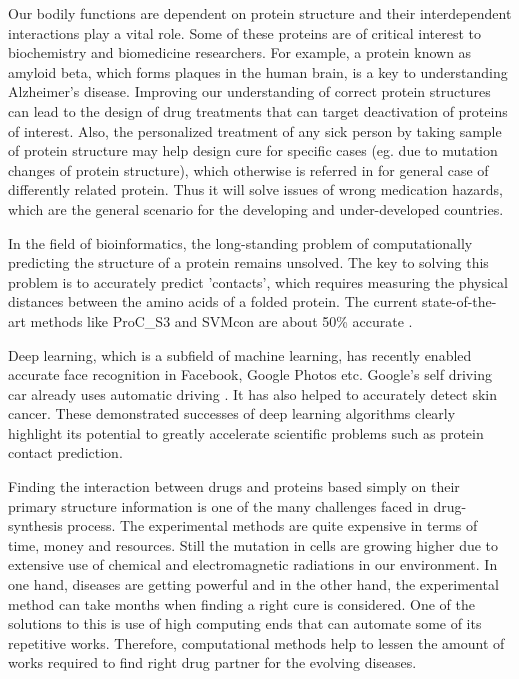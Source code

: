 Our bodily functions are dependent on protein structure and their interdependent interactions play a vital role. Some of these proteins are of critical interest to biochemistry and biomedicine researchers.\cite{Astrand2019} For example, a protein known as amyloid beta, which forms plaques in the human brain, is a key to understanding Alzheimer's disease. Improving our understanding of correct protein structures can lead to the design of drug treatments that can target deactivation of proteins of interest. Also, the personalized treatment of any sick person by taking sample of protein structure may help design cure for specific cases (eg. due to mutation changes of protein structure), which otherwise is referred in for general case of differently related protein. Thus it will solve issues of wrong medication hazards, which are the general scenario for the developing and under-developed countries.


In the field of bioinformatics, the long-standing problem of computationally predicting the structure of a protein remains unsolved\cite{Finkelstein2017b}. The key to solving this problem is to accurately predict 'contacts', which requires measuring the physical distances between the amino acids of a folded protein. The current state-of-the-art methods like ProC\_S3 and SVMcon are about 50\% accurate \cite{Adhikari2017}.		

Deep learning, which is a subfield of machine learning, has recently enabled accurate face recognition in Facebook, Google Photos etc. Google’s self driving car already uses automatic driving \cite{Becker2008}. It has also helped to accurately detect skin cancer. These demonstrated successes of deep learning algorithms clearly highlight its potential to greatly accelerate scientific problems such as protein contact prediction. 

Finding the interaction between drugs and proteins based simply on their primary structure information is one of the many challenges faced in drug-synthesis process. The experimental methods are quite expensive in terms of time, money and resources. Still the mutation in cells are growing higher due to extensive use of chemical and electromagnetic radiations in our environment. In one hand, diseases are getting powerful and in the other hand, the experimental method can take months when finding a right cure is considered. One of the solutions to this is use of high computing ends that can automate some of its repetitive works. Therefore, computational methods help to lessen the amount of works required to find right drug partner for the evolving diseases.

